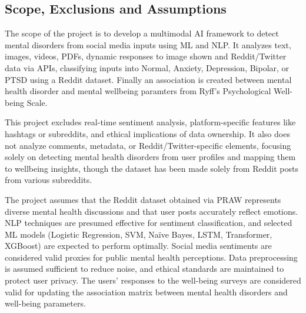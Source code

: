 \subsection{Scope, Exclusions and Assumptions}
\noindent
The scope of the project is to develop a multimodal AI framework to detect mental disorders from social media inputs using ML and NLP. It analyzes text, images, videos, PDFs, dynamic responses to image shown and Reddit/Twitter data via APIs, classifying inputs into Normal, Anxiety, Depression, Bipolar, or PTSD using a Reddit dataset. Finally an association is created between mental health disorder and mental wellbeing paramters from Ryff's Psychological Well-being Scale.

\vspace{1em}

\noindent
This project excludes real-time sentiment analysis, platform-specific features like hashtags or subreddits, and ethical implications of data ownership. It also does not analyze comments, metadata, or Reddit/Twitter-specific elements, focusing solely on detecting mental health disorders from user profiles and mapping them to wellbeing insights, though the dataset has been made solely from Reddit posts from various subreddits.

\vspace{1em}

\noindent
The project assumes that the Reddit dataset obtained via PRAW represents diverse mental health discussions and that user posts accurately reflect emotions. NLP techniques are presumed effective for sentiment classification, and selected ML models (Logistic Regression, SVM, Naïve Bayes, LSTM, Transformer, XGBoost) are expected to perform optimally. Social media sentiments are considered valid proxies for public mental health perceptions. Data preprocessing is assumed sufficient to reduce noise, and ethical standards are maintained to protect user privacy. The users' responses to the well-being surveys are considered valid for updating the association matrix between mental health disorders and well-being parameters.


